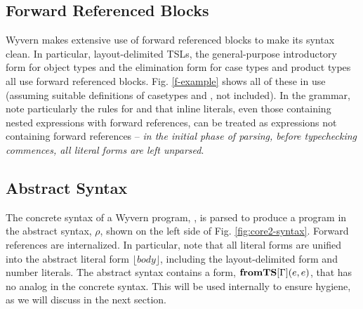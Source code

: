 \subsection{Forward Referenced Blocks}
Wyvern makes extensive use of forward referenced blocks to make its syntax clean. In particular, layout-delimited TSLs, the general-purpose introductory form for object types and the elimination form for case types and product types all use forward referenced blocks. Fig. \ref{f-example} shows all of these in use (assuming suitable definitions of casetypes  and , not included). In the grammar, note particularly the rules for  and that inline literals, even those containing nested expressions with forward references, can be treated as expressions not containing forward references -- \emph{in the initial phase of parsing, before typechecking commences, all literal forms are left unparsed}.

\subsection{Abstract Syntax}
The concrete syntax of a Wyvern program, , is parsed to produce a program in the abstract syntax, $\rho$, shown on the left side of Fig. \ref{fig:core2-syntax}. Forward references are internalized. In particular, note that all literal forms are unified into the abstract literal form $\lfloor body \rfloor$, including the layout-delimited form and number literals. The abstract syntax contains a form, $\textbf{fromTS}[\Gamma](e,e)$, that has no analog in the concrete syntax. This will be used internally to ensure hygiene, as we will discuss in the next section.

